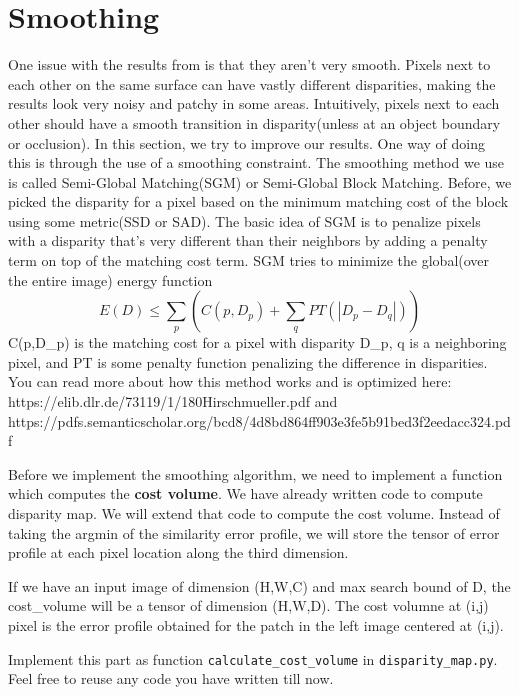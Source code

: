 \documentclass[
  letterpaper,
  DIV=11,
  numbers=noendperiod]{scrartcl}
\begin{document}
\hypertarget{smoothing}{%
\section{Smoothing}\label{smoothing}}

One issue with the results from is that they aren't very smooth. Pixels
next to each other on the same surface can have vastly different
disparities, making the results look very noisy and patchy in some
areas. Intuitively, pixels next to each other should have a smooth
transition in disparity(unless at an object boundary or occlusion). In
this section, we try to improve our results. One way of doing this is
through the use of a smoothing constraint. The smoothing method we use
is called Semi-Global Matching(SGM) or Semi-Global Block Matching.
Before, we picked the disparity for a pixel based on the minimum
matching cost of the block using some metric(SSD or SAD). The basic idea
of SGM is to penalize pixels with a disparity that's very different than
their neighbors by adding a penalty term on top of the matching cost
term. SGM tries to minimize the global(over the entire image) energy
function \begin{equation*}
E(D) \leq \sum_{p} (C(p, D_p) + \sum_{q} PT(|D_p - D_q|))
\end{equation*} C(p,D\_p) is the matching cost for a pixel with
disparity D\_p, q is a neighboring pixel, and PT is some penalty
function penalizing the difference in disparities. You can read more
about how this method works and is optimized here:
https://elib.dlr.de/73119/1/180Hirschmueller.pdf and
https://pdfs.semanticscholar.org/bcd8/4d8bd864ff903e3fe5b91bed3f2eedacc324.pdf

Before we implement the smoothing algorithm, we need to implement a
function which computes the \textbf{cost volume}. We have already
written code to compute disparity map. We will extend that code to
compute the cost volume. Instead of taking the argmin of the similarity
error profile, we will store the tensor of error profile at each pixel
location along the third dimension.

If we have an input image of dimension (H,W,C) and max search bound of
D, the cost\_volume will be a tensor of dimension (H,W,D). The cost
volumne at (i,j) pixel is the error profile obtained for the patch in
the left image centered at (i,j).

Implement this part as function \texttt{calculate\_cost\_volume} in
\texttt{disparity\_map.py}. Feel free to reuse any code you have written
till now.
\end{document}

